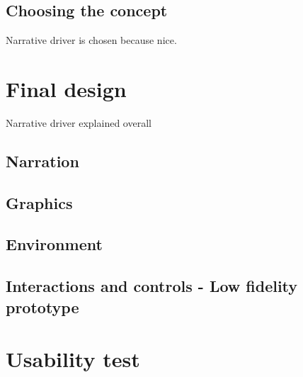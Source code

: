 \subsection{Choosing the concept}
Narrative driver is chosen because nice.

\section{Final design}
Narrative driver explained overall

\subsection{Narration}

\subsection{Graphics}

\subsection{Environment}

\subsection{Interactions and controls - Low fidelity prototype}

\section{Usability test}


